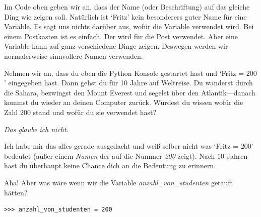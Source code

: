 Im Code oben geben wir an, dass der Name (oder Beschriftung)  auf das gleiche Ding wie  zeigen soll.
Natürlich ist `Fritz' kein besonderers guter Name für eine Variable. Es sagt uns nichts darüber aus, wofür die Variable verwendet wird. Bei einem Postkasten ist es einfach. Der wird für die Post verwendet. Aber eine Variable kann auf ganz verschiedene Dinge zeigen. Deswegen werden wir normalerweise sinnvollere Namen verwenden.
\par
Nehmen wir an, dass du eben die Python Konsole gestartet hast und `Fritz = $200$' eingegeben hast. Dann gehst du für 10 Jahre auf Weltreise. Du wanderst durch die Sahara, bezwingst den Mount Everest und segelst über den Atlantik---danach kommst du wieder an deinen Computer zurück. Würdest du wissen wofür die Zahl $200$ stand und wofür du sie verwendet hast?

\noindent
\emph{Das glaube ich nicht.}

\noindent
Ich habe mir das alles gerade ausgedacht und weiß selber nicht was `Fritz = $200$' bedeutet (außer einem \emph{Namen} der auf die Nummer \emph{200} zeigt). Nach $10$ Jahren hast du überhaupt keine Chance dich an die Bedeutung zu erinnern.
\par
Aha! Aber was wäre wenn wir die Variable \emph{anzahl\_von\_studenten} getauft hätten?

\begin{Verbatim}[frame=single]
>>> anzahl_von_studenten = 200
\end{Verbatim}

